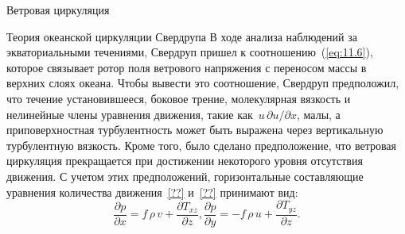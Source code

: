 \begin{chapter}{Ветровая циркуляция}
\begin{section}{Теория океанской циркуляции Свердрупа}\label{sec:SverdrupTheory}
%
В ходе анализа наблюдений за экваториальными
течениями, Свердруп пришел к соотношению~(\ref{eq:11.6}), которое связывает
ротор поля ветрового напряжения с переносом
массы в верхних слоях океана. Чтобы вывести это
соотношение, Свердруп предположил, что течение установившееся, 
боковое трение, молекулярная вязкость
и нелинейные члены уравнения движения, такие
как~$u\, \partial{u} / \partial{x}$, малы, 
а приповерхностная турбулентность 
может быть выражена через вертикальную турбулентную вязкость. 
Кроме того, было сделано предположение, что ветровая циркуляция 
прекращается при достижении некоторого уровня отсутствия движения.
С учетом этих предположений, горизонтальные составляющие уравнения
количества движения~\ref{??} и~\ref{??} принимают вид:
\begin{subequations}\label{eq:11.1}
\begin{equation}
 \frac{\partial{p}}{\partial{x}} 
    =  f\,\rho\,v + \frac{\partial{T_{xz}}}{\partial{z}},
\end{equation}
\begin{equation}
  \frac{\partial{p}}{\partial{y}} 
    = -f\,\rho\,u + \frac{\partial{T_{yz}}}{\partial{z}}.
\end{equation}
\end{subequations}
%


\end{section}
\end{chapter}
